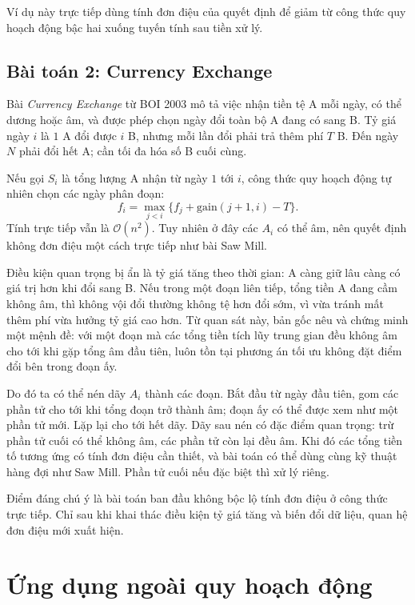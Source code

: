 \documentclass[11pt]{article}
\newcommand{\Oh}{\mathcal{O}}
\begin{document}
Ví dụ này trực tiếp dùng tính đơn điệu của quyết định để giảm từ công thức
quy hoạch động bậc hai xuống tuyến tính sau tiền xử lý.

\subsection{Bài toán 2: Currency Exchange}

Bài \textit{Currency Exchange} từ BOI 2003 mô tả việc nhận tiền tệ A mỗi ngày,
có thể dương hoặc âm, và được phép chọn ngày đổi toàn bộ A đang có sang B.
Tỷ giá ngày \(i\) là \(1\) A đổi được \(i\) B, nhưng mỗi lần đổi phải trả thêm
phí \(T\) B. Đến ngày \(N\) phải đổi hết A; cần tối đa hóa số B cuối cùng.

Nếu gọi \(S_i\) là tổng lượng A nhận từ ngày \(1\) tới \(i\), công thức quy
hoạch động tự nhiên chọn các ngày phân đoạn:
\[
  f_i=\max_{j<i}\{f_j+\text{gain}(j+1,i)-T\}.
\]
Tính trực tiếp vẫn là \(\Oh(n^2)\). Tuy nhiên ở đây các \(A_i\) có thể âm, nên
quyết định không đơn điệu một cách trực tiếp như bài Saw Mill.

Điều kiện quan trọng bị ẩn là tỷ giá tăng theo thời gian: A càng giữ lâu càng
có giá trị hơn khi đổi sang B. Nếu trong một đoạn liên tiếp, tổng tiền A đang
cầm không âm, thì không vội đổi thường không tệ hơn đổi sớm, vì vừa tránh mất
thêm phí vừa hưởng tỷ giá cao hơn. Từ quan sát này, bản gốc nêu và chứng minh
một mệnh đề: với một đoạn mà các tổng tiền tích lũy trung gian đều không âm
cho tới khi gặp tổng âm đầu tiên, luôn tồn tại phương án tối ưu không đặt điểm
đổi bên trong đoạn ấy.

Do đó ta có thể nén dãy \(A_i\) thành các đoạn. Bắt đầu từ ngày đầu tiên, gom
các phần tử cho tới khi tổng đoạn trở thành âm; đoạn ấy có thể được xem như
một phần tử mới. Lặp lại cho tới hết dãy. Dãy sau nén có đặc điểm quan trọng:
trừ phần tử cuối có thể không âm, các phần tử còn lại đều âm. Khi đó các tổng
tiền tố tương ứng có tính đơn điệu cần thiết, và bài toán có thể dùng cùng
kỹ thuật hàng đợi như Saw Mill. Phần tử cuối nếu đặc biệt thì xử lý riêng.

Điểm đáng chú ý là bài toán ban đầu không bộc lộ tính đơn điệu ở công thức
trực tiếp. Chỉ sau khi khai thác điều kiện tỷ giá tăng và biến đổi dữ liệu,
quan hệ đơn điệu mới xuất hiện.

\section{Ứng dụng ngoài quy hoạch động}
\end{document}
